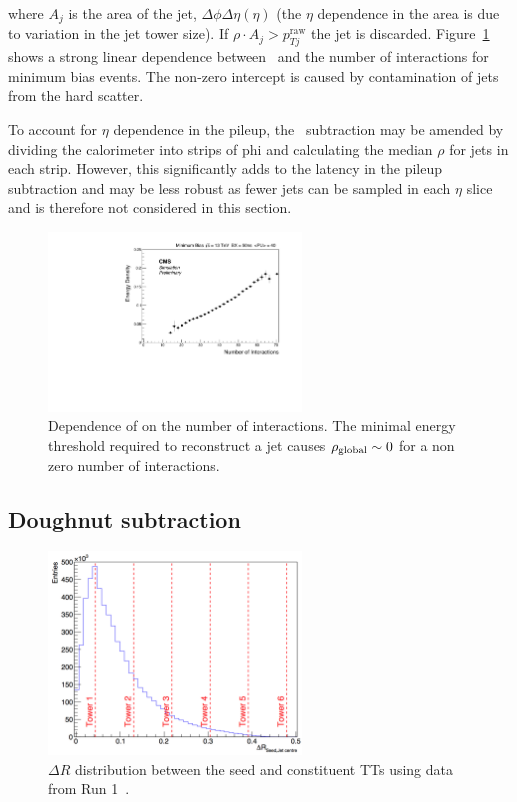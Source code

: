 \noindent where $A_j$ is the area of the jet, $\Delta\phi\Delta\eta(\eta)$ (the $\eta$ dependence in the area is due 
to variation in the jet tower size). If $\rho \cdot A_j > p_{Tj}^{\text{raw}}$ the jet is discarded. 
Figure~\ref{fig:medianNint} shows a strong linear dependence between \rhoG~and the number of interactions for
minimum bias events. The non-zero intercept is caused by contamination of jets from the hard scatter.

To account for $\eta$ dependence in the pileup, the \rhoG~subtraction may be amended by
dividing the calorimeter into strips of phi and calculating the median $\rho$ for jets in each 
strip. However, this significantly adds to the latency in the pileup subtraction and may 
be less robust as fewer jets can be sampled in each $\eta$ slice and 
is therefore not considered in this section.

\begin{figure}
\centering
    \includegraphics[width=0.6\textwidth]{./Figures/triggerUpgrade/median}
  \caption{Dependence of \rhoG on the number of interactions. The minimal energy threshold 
  required to reconstruct a jet causes $\rho_{\text{global}} \sim 0$ for
  a non zero number of interactions.}
  \label{fig:medianNint}
\end{figure}  

\subsection{Doughnut subtraction}
\begin{figure}
\centering
    \includegraphics[width=0.6\textwidth]{./Figures/triggerUpgrade/deltaR2}
  \caption{$\Delta R$ distribution between the seed and constituent TTs using data from Run 1~\cite{mark-thesis}.}
  \label{fig:deltaR2}
\end{figure}  


